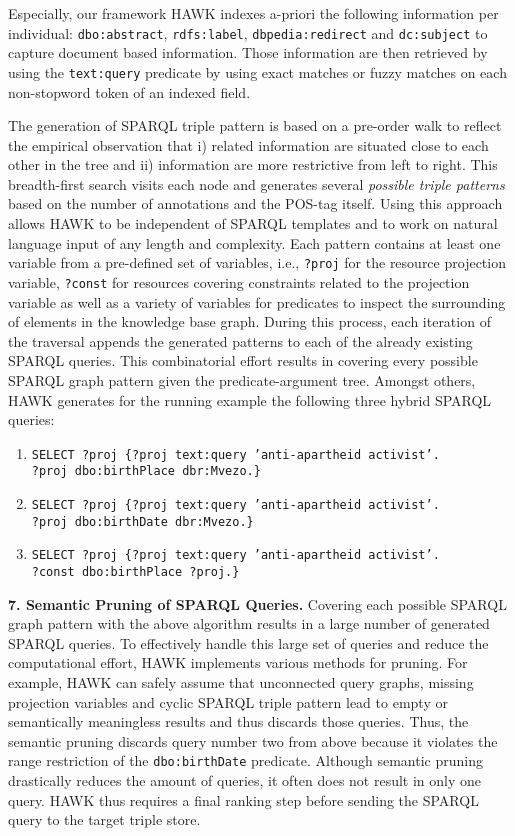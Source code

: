 \documentclass{llncs}
\begin{document}
Especially, our framework HAWK indexes a-priori the following information per individual: \texttt{dbo:abstract}, \texttt{rdfs:label}, \texttt{dbpedia:redirect} and \texttt{dc:subject} to capture document based information.
Those information are then retrieved by using the \texttt{text:query} predicate by using exact matches or fuzzy matches on each non-stopword token of an indexed field.

The generation of SPARQL triple pattern is based on a pre-order walk to reflect the empirical observation that i) related information are situated close to each other in the tree and ii) information are more restrictive from left to right.
This breadth-first search visits each node and generates several \emph{possible triple patterns} based on the number of annotations and the POS-tag itself. 
Using this approach allows HAWK to be independent of SPARQL templates and to work on natural language input of any length and complexity.
Each pattern contains at least one variable from a pre-defined set of variables, i.e., \texttt{?proj} for the resource projection variable, \texttt{?const} for resources covering 
constraints related to the projection variable as well as a variety of variables for predicates to inspect the surrounding of elements in the knowledge base graph. 
During this process, each iteration of the traversal appends the generated patterns to each of the already existing SPARQL queries. 
This combinatorial effort results in covering every possible SPARQL graph pattern given the predicate-argument tree.
Amongst others, HAWK generates for the running example the following three hybrid SPARQL queries:
\begin{enumerate}
\item \texttt{SELECT ?proj  \{?proj text:query 'anti-apartheid activist'.\\ ?proj dbo:birthPlace dbr:Mvezo.\}}
\item \texttt{SELECT ?proj  \{?proj text:query 'anti-apartheid activist'.\\ ?proj dbo:birthDate dbr:Mvezo.\}}
\item \texttt{SELECT ?proj  \{?proj text:query 'anti-apartheid activist'.\\ ?const dbo:birthPlace ?proj.\}}
\end{enumerate}

\textbf{7. Semantic Pruning of SPARQL Queries.}
Covering each possible SPARQL graph pattern with the above algorithm results in a large number of generated SPARQL queries.
To effectively handle this large set of queries and reduce the computational effort, HAWK implements various methods for pruning. 
For example, HAWK can safely assume that unconnected query graphs, missing projection variables and cyclic SPARQL triple pattern lead to empty or semantically meaningless results and thus discards those queries.
Thus, the semantic pruning discards query number two from above because it violates the range restriction of the \texttt{dbo:birthDate} predicate.
Although semantic pruning drastically reduces the amount of queries, it often does not result in only one query. HAWK thus requires a final ranking step before sending the SPARQL query to the target triple store.
\end{document}
